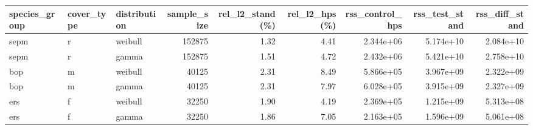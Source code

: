 \begin{tabular}{lllrrrrrr}
\toprule
species\_group & cover\_type & distribution & sample\_size & rel\_l2\_stand(\%) & rel\_l2\_hps(\%) & rss\_control\_hps & rss\_test\_stand & rss\_diff\_stand \\
\midrule
sepm & r & weibull & 152875 & 1.32 & 4.41 & 2.344e+06 & 5.174e+10 & 2.084e+10 \\
sepm & r & gamma & 152875 & 1.51 & 4.72 & 2.432e+06 & 5.421e+10 & 2.758e+10 \\
bop & m & weibull & 40125 & 2.31 & 8.49 & 5.866e+05 & 3.967e+09 & 2.322e+09 \\
bop & m & gamma & 40125 & 2.31 & 7.97 & 6.028e+05 & 3.915e+09 & 2.327e+09 \\
ers & f & weibull & 32250 & 1.90 & 4.19 & 2.369e+05 & 1.215e+09 & 5.313e+08 \\
ers & f & gamma & 32250 & 1.86 & 7.05 & 2.163e+05 & 1.596e+09 & 5.061e+08 \\
\bottomrule
\end{tabular}
